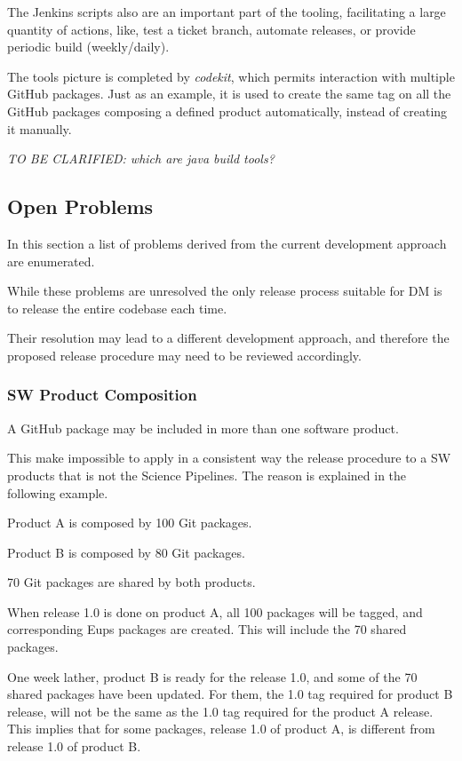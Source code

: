 The Jenkins scripts also are an important part of the tooling, facilitating a large quantity of actions, like, test a ticket branch, automate releases, or provide periodic build (weekly/daily).

The tools picture is completed by \textit{codekit}, which permits interaction with multiple GitHub packages.
Just as an example, it is used to create the same tag on all the GitHub packages composing a defined product automatically, instead of creating it manually.

\textit{TO BE CLARIFIED: which are java build tools?}


\subsection{Open Problems} \label{sec:openProblems}

In this section a list of problems derived from the current development approach are enumerated. 

While these problems are unresolved the only release process suitable for DM is to release the entire codebase each time.

Their resolution may lead to a different development approach, and therefore the proposed release procedure may need to be reviewed accordingly.


\subsubsection{SW Product Composition} \label{sec:problemId}

A GitHub package may be included in more than one software product.

This make impossible to apply in a consistent way the release procedure to a SW products that is not the Science Pipelines.
The reason is explained in the following example.

Product A is composed by 100 Git packages.

Product B is composed by 80 Git packages.

70 Git packages are shared by both products.

When release 1.0 is done on product A, all 100 packages will be tagged, and corresponding Eups packages are created. This will include the 70 shared packages.

One week lather, product B is ready for the release 1.0, and some of the 70 shared packages have been updated.
For them, the 1.0 tag required for product B release, will not be the same as the 1.0 tag required for the product A release.
This implies that for some packages, release 1.0 of product A, is different from release 1.0 of product B.

